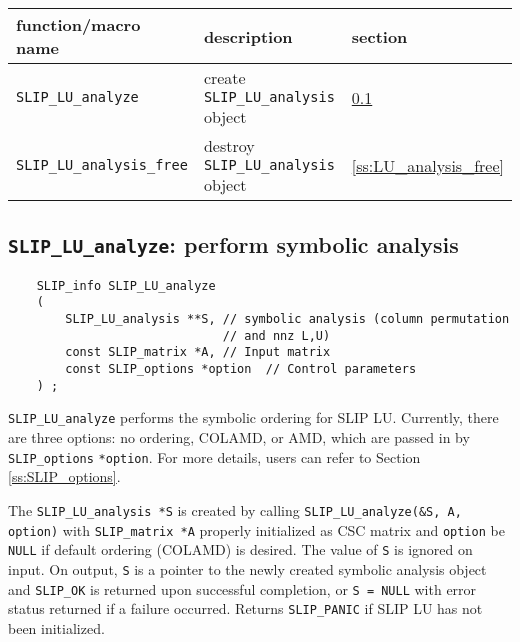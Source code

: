 \documentclass[12pt]{article}
\theoremstyle{definition}
\begin{document}
{\small
\begin{center}
\begin{tabular}{lll}
\hline
function/macro name & description & section \\
\hline
\verb|SLIP_LU_analyze|
    & create \verb|SLIP_LU_analysis| object
    & \ref{s:SLIP_LU_analyze} \\
\hline
\verb|SLIP_LU_analysis_free|
    & destroy \verb|SLIP_LU_analysis| object
    & \ref{ss:LU_analysis_free} \\
\hline
\end{tabular}
\end{center}
}

\cprotect\subsection{\verb|SLIP_LU_analyze|: perform symbolic analysis}
\label{s:SLIP_LU_analyze}

\begin{mdframed}[userdefinedwidth=6in]
{\footnotesize
\begin{verbatim}
    SLIP_info SLIP_LU_analyze
    (
        SLIP_LU_analysis **S, // symbolic analysis (column permutation
                              // and nnz L,U)
        const SLIP_matrix *A, // Input matrix
        const SLIP_options *option  // Control parameters
    ) ;
\end{verbatim}
} \end{mdframed}

\verb|SLIP_LU_analyze| performs the symbolic ordering for SLIP LU. Currently,
there are three options: no ordering, COLAMD, or AMD, which are passed in by
\verb|SLIP_options| \verb|*option|. For more details, users can refer to
Section \ref{ss:SLIP_options}.

The \verb|SLIP_LU_analysis *S| is created by calling
\verb|SLIP_LU_analyze(&S, A, option)| with \verb|SLIP_matrix *A| properly
initialized as CSC matrix and \verb|option| be \verb|NULL| if default ordering
(COLAMD) is desired. The value of \verb|S| is ignored on input.  On output,
\verb|S| is a pointer to the newly created symbolic analysis object and
\verb|SLIP_OK| is returned upon successful completion, or \verb|S = NULL| with
error status returned if a failure occurred.  Returns \verb|SLIP_PANIC| if SLIP
LU has not been initialized.
\end{document}
